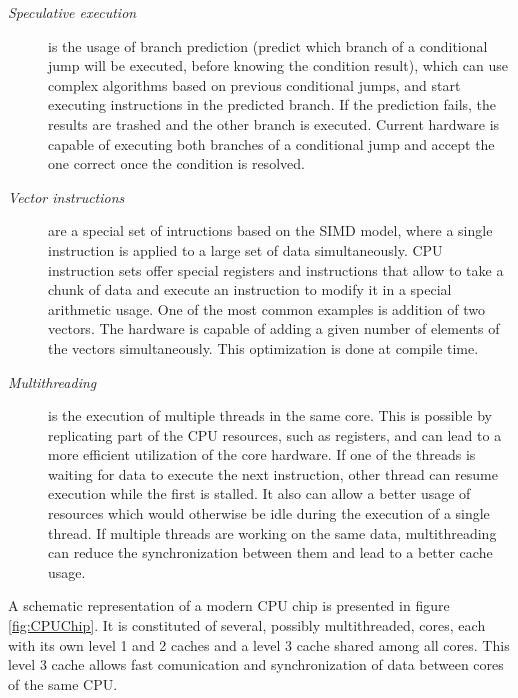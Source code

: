 \begin{description}
\begin{description}
	\end{description}
	\item[\textit{Speculative execution}] is the usage of branch prediction (predict which branch of a conditional jump will be executed, before knowing the condition result), which can use complex algorithms based on previous conditional jumps, and start executing instructions in the predicted branch. If the prediction fails, the results are trashed and the other branch is executed. Current hardware is capable of executing both branches of a conditional jump and accept the one correct once the condition is resolved.
	\item[\textit{Vector instructions}] are a special set of intructions based on the SIMD model, where a single instruction is applied to a large set of data simultaneously. CPU instruction sets offer special registers and instructions that allow to take a chunk of data and execute an instruction to modify it in a special arithmetic usage. One of the most common examples is addition of two vectors. The hardware is capable of adding a given number of elements of the vectors simultaneously. This optimization is done at compile time.
	\item[\textit{Multithreading}] is the execution of multiple threads in the same core. This is possible by replicating part of the CPU resources, such as registers, and can lead to a more efficient utilization of the core hardware. If one of the threads is waiting for data to execute the next instruction, other thread can resume execution while the first is stalled. It also can allow a better usage of resources which would otherwise be idle during the execution of a single thread. If multiple threads are working on the same data, multithreading can reduce the synchronization between them and lead to a better cache usage.
\end{description}

A schematic representation of a modern CPU chip is presented in figure \ref{fig:CPUChip}. It is constituted of several, possibly multithreaded, cores, each with its own level 1 and 2 caches and a level 3 cache shared among all cores. This level 3 cache allows fast comunication and synchronization of data between cores of the same CPU.

